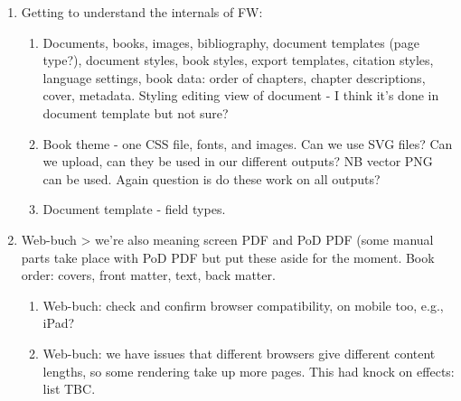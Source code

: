\documentclass{article}
\begin{document}
\begin{enumerate}
\item Getting to understand the internals of FW: 

\begin{enumerate}
\item Documents, books, images, bibliography, document templates (page type?), document styles, book styles, export templates, citation styles, language settings, book data: order of chapters, chapter descriptions, cover, metadata. Styling editing view of document - I think it’s done in document template but not sure?


\item Book theme - one CSS file, fonts, and images. Can we use SVG files? Can we upload, can they be used in our different outputs? NB vector PNG can be used. Again question is do these work on all outputs?


\item Document template - field types. 


\end{enumerate}

\item Web-buch > we’re also meaning screen PDF and PoD PDF (some manual parts take place with PoD PDF but put these aside for the moment. Book order: covers, front matter, text, back matter.

\begin{enumerate}
\item Web-buch: check and confirm browser compatibility, on mobile too, e.g., iPad?


\item Web-buch: we have issues that different browsers give different content lengths, so some rendering take up more pages. This had knock on effects: list TBC.






\end{enumerate}

\end{enumerate}
\end{document}

